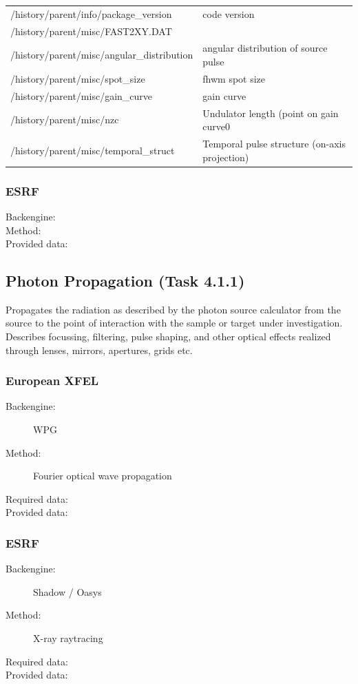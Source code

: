 \documentclass[12pt]{scrartcl}
\begin{document}
{\begin{tabular}{l|l}
      /history/parent/info/package\_version    & code version \\
      /history/parent/misc/FAST2XY.DAT    &  \\
      /history/parent/misc/angular\_distribution     & angular distribution of source pulse \\
      /history/parent/misc/spot\_size    & fhwm spot size \\
      /history/parent/misc/gain\_curve     & gain curve \\
      /history/parent/misc/nzc    & Undulator length (point on gain curve0 \\
      /history/parent/misc/temporal\_struct    & Temporal pulse structure (on-axis projection) \\
      \hline
      \hline
    \end{tabular}
    }

\subsubsection{ESRF}
\begin{description}
  \item[Backengine:]
  \item[Method:]
  \item[Provided data:]

\end{description}

\subsection{Photon Propagation (Task 4.1.1)}
Propagates the radiation as described by the photon source calculator from the
source to the point of interaction with the sample or target under
investigation. Describes focussing, filtering, pulse shaping, and other optical
effects realized through lenses, mirrors, apertures, grids etc.
\subsubsection{European XFEL}
\begin{description}
  \item[Backengine:] WPG \cite{Samoylova2016, wpg_github}
  \item[Method:] Fourier optical wave propagation
  \item[Required data:]
  \item[Provided data:]
\end{description}
%
\subsubsection{ESRF}
\begin{description}
  \item[Backengine:] Shadow / Oasys
  \item[Method:] X-ray raytracing
  \item[Required data:]
  \item[Provided data:]
\end{description}
\end{document}
